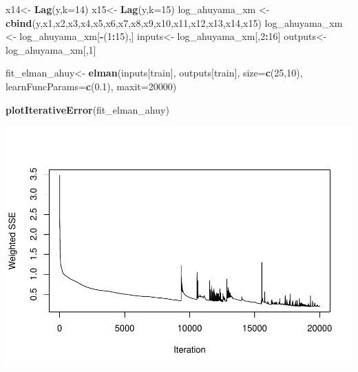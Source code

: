 \documentclass[
]{book}
\newenvironment{Shaded}{\begin{snugshade}}{\end{snugshade}}
\newcommand{\AttributeTok}[1]{\textcolor[rgb]{0.13,0.29,0.53}{#1}}
\newcommand{\DecValTok}[1]{\textcolor[rgb]{0.00,0.00,0.81}{#1}}
\newcommand{\FloatTok}[1]{\textcolor[rgb]{0.00,0.00,0.81}{#1}}
\newcommand{\FunctionTok}[1]{\textcolor[rgb]{0.13,0.29,0.53}{\textbf{#1}}}
\newcommand{\NormalTok}[1]{#1}
\newcommand{\OtherTok}[1]{\textcolor[rgb]{0.56,0.35,0.01}{#1}}
\newcommand{\SpecialCharTok}[1]{\textcolor[rgb]{0.81,0.36,0.00}{\textbf{#1}}}
\begin{document}
\begin{Shaded}
\begin{Highlighting}[]
\NormalTok{x14}\OtherTok{\textless{}{-}} \FunctionTok{Lag}\NormalTok{(y,}\AttributeTok{k=}\DecValTok{14}\NormalTok{)}
\NormalTok{x15}\OtherTok{\textless{}{-}} \FunctionTok{Lag}\NormalTok{(y,}\AttributeTok{k=}\DecValTok{15}\NormalTok{) }
\NormalTok{log\_ahuyama\_xm }\OtherTok{\textless{}{-}} \FunctionTok{cbind}\NormalTok{(y,x1,x2,x3,x4,x5,x6,x7,x8,x9,x10,x11,x12,x13,x14,x15)}
\NormalTok{log\_ahuyama\_xm }\OtherTok{\textless{}{-}}\NormalTok{ log\_ahuyama\_xm[}\SpecialCharTok{{-}}\NormalTok{(}\DecValTok{1}\SpecialCharTok{:}\DecValTok{15}\NormalTok{),]}
\NormalTok{inputs}\OtherTok{\textless{}{-}}\NormalTok{ log\_ahuyama\_xm[,}\DecValTok{2}\SpecialCharTok{:}\DecValTok{16}\NormalTok{]}
\NormalTok{outputs}\OtherTok{\textless{}{-}}\NormalTok{ log\_ahuyama\_xm[,}\DecValTok{1}\NormalTok{]}

\NormalTok{fit\_elman\_ahuy}\OtherTok{\textless{}{-}} \FunctionTok{elman}\NormalTok{(inputs[train],}
\NormalTok{                       outputs[train],}
                       \AttributeTok{size=}\FunctionTok{c}\NormalTok{(}\DecValTok{25}\NormalTok{,}\DecValTok{10}\NormalTok{),}
                       \AttributeTok{learnFuncParams=}\FunctionTok{c}\NormalTok{(}\FloatTok{0.1}\NormalTok{),}
                       \AttributeTok{maxit=}\DecValTok{20000}\NormalTok{)}


\FunctionTok{plotIterativeError}\NormalTok{(fit\_elman\_ahuy)}
\end{Highlighting}
\end{Shaded}

\includegraphics{bookdown-demo_files/figure-latex/unnamed-chunk-188-169.pdf}
\end{document}
